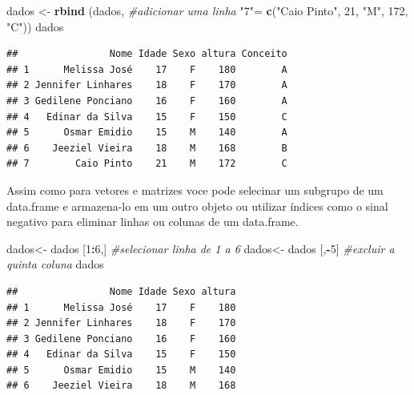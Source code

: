 \documentclass[
]{book}
\newenvironment{Shaded}{\begin{snugshade}}{\end{snugshade}}
\newcommand{\CommentTok}[1]{\textcolor[rgb]{0.56,0.35,0.01}{\textit{#1}}}
\newcommand{\DecValTok}[1]{\textcolor[rgb]{0.00,0.00,0.81}{#1}}
\newcommand{\KeywordTok}[1]{\textcolor[rgb]{0.13,0.29,0.53}{\textbf{#1}}}
\newcommand{\NormalTok}[1]{#1}
\newcommand{\OperatorTok}[1]{\textcolor[rgb]{0.81,0.36,0.00}{\textbf{#1}}}
\newcommand{\StringTok}[1]{\textcolor[rgb]{0.31,0.60,0.02}{#1}}
\begin{document}
\begin{Shaded}
\begin{Highlighting}[]
\NormalTok{dados <-}\StringTok{ }\KeywordTok{rbind}\NormalTok{ (dados, }\CommentTok{#adicionar uma linha}
                \StringTok{"7"}\NormalTok{=}\StringTok{ }\KeywordTok{c}\NormalTok{(}\StringTok{"Caio Pinto"}\NormalTok{, }\DecValTok{21}\NormalTok{, }\StringTok{"M"}\NormalTok{, }\DecValTok{172}\NormalTok{, }\StringTok{"C"}\NormalTok{))}
\NormalTok{dados}
\end{Highlighting}
\end{Shaded}

\begin{verbatim}
##                Nome Idade Sexo altura Conceito
## 1      Melissa José    17    F    180        A
## 2 Jennifer Linhares    18    F    170        A
## 3 Gedilene Ponciano    16    F    160        A
## 4   Edinar da Silva    15    F    150        C
## 5      Osmar Emidio    15    M    140        A
## 6    Jeeziel Vieira    18    M    168        B
## 7        Caio Pinto    21    M    172        C
\end{verbatim}

Assim como para vetores e matrizes voce pode selecinar um subgrupo de um data.frame e armazena-lo em um outro objeto ou utilizar índices como o sinal negativo para eliminar linhas ou colunas de um data.frame.

\begin{Shaded}
\begin{Highlighting}[]
\NormalTok{dados<-}\StringTok{ }\NormalTok{dados [}\DecValTok{1}\OperatorTok{:}\DecValTok{6}\NormalTok{,] }\CommentTok{#selecionar linha de 1 a 6}
\NormalTok{dados<-}\StringTok{ }\NormalTok{dados [,}\OperatorTok{-}\DecValTok{5}\NormalTok{] }\CommentTok{#excluir a quinta coluna}
\NormalTok{dados}
\end{Highlighting}
\end{Shaded}

\begin{verbatim}
##                Nome Idade Sexo altura
## 1      Melissa José    17    F    180
## 2 Jennifer Linhares    18    F    170
## 3 Gedilene Ponciano    16    F    160
## 4   Edinar da Silva    15    F    150
## 5      Osmar Emidio    15    M    140
## 6    Jeeziel Vieira    18    M    168
\end{verbatim}

\begin{Shaded}
\end{Shaded}
\end{document}
